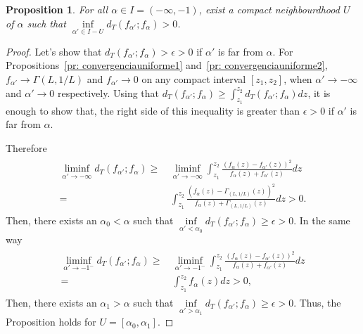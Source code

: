 \documentclass[technote,onecolumn,draftcls,12pt]{IEEEtran}
\newtheorem{proposition}{Proposition}
\numberwithin{equation}{section}
\newenvironment{dem}[1][Proof]{\begin{proof}[{\it #1}]}{\end{proof}}
\newcommand{\al}{&\,}
\newcommand{\pa}[1]{\ensuremath{\left( #1 \right)}}
\begin{document}
\begin{proposition}
	\label{pr: falpha>0}
	For all $\alpha\in I=(-\infty,-1)$, exist a compact neighbourdhood $U$ of $\alpha$ such that
	$\inf\limits_{\alpha'\in I-U}d_{T}({f_{\alpha'};f_{\alpha}})>0$.
\end{proposition}
\begin{dem}
	Let's show that $d_{T}({f_{\alpha'};f_{\alpha}})>\epsilon>0$ if $\alpha'$ is far from $\alpha$. For Propositions~\ref{pr: convergenciauniforme1} and~\ref{pr: convergenciauniforme2}, $f_{\alpha'} \to \Gamma(L,1/L)$ and $f_{\alpha'} \to 0$ on any compact interval $[z_1,z_2]$, when $\alpha' \to -\infty$ and $\alpha' \to 0$ respectively.
	Using that $d_{T}\pa{f_{\alpha'};f_{\alpha}} \ge \int_{z_{1}}^{z_{2}}d_{T}\pa{f_{\alpha'};f_{\alpha}}dz$, it is enough to show that, the right side of this inequality is greater than $\epsilon>0$ if $\alpha'$ is far from $\alpha$.
	
	Therefore
	\begin{align*}
	\begin{split}
	\liminf_{\alpha'\to-\infty} d_{T}\pa{f_{\alpha'};f_{\alpha}} 
	\ge \al \liminf_{\alpha'\to-\infty}\int_{z_{1}}^{z_{2}}\frac{\pa{f_{\alpha}\pa{z}-f_{\alpha'}\pa{z}}^{2}}
	{f_{\alpha}\pa{z}+f_{\alpha'}\pa{z}}dz \\
	= \al \int_{z_{1}}^{z_{2}}\frac{\pa{f_{\alpha}\pa{z}-\Gamma_{(L,1/L)}\pa{z}}^{2}}
	{f_{\alpha}\pa{z}+\Gamma_{(L,1/L)}\pa{z}}dz >0.
	\end{split}
	\end{align*}
	Then, there exists an $\alpha_0 < \alpha$ such that $\inf\limits_{\alpha'<\alpha_0} d_{T}\pa{f_{\alpha'};f_{\alpha}} \ge \epsilon>0.$ 
	In the same way
	\begin{align*}
	\begin{split}
	\liminf_{\alpha'\to-1^{-}} d_{T}\pa{f_{\alpha'};f_{\alpha}} 
	\ge \al \liminf_{\alpha'\to-1^{-}}\int_{z_{1}}^{z_{2}}\frac{\pa{f_{\alpha}\pa{z}-f_{\alpha'}\pa{z}}^{2}}
	{f_{\alpha}\pa{z}+f_{\alpha'}\pa{z}}dz \\
	= \al \int_{z_{1}}^{z_{2}}f_{\alpha}\pa{z}dz >0,
	\end{split}
	\end{align*}
	Then, there exists an $\alpha_1>\alpha$ such that $\inf\limits_{\alpha'>\alpha_1} d_{T}\pa{f_{\alpha'};f_{\alpha}} \ge \epsilon>0.$ 
	Thus, the Proposition holds for $U=[\alpha_0,\alpha_1].$
\end{dem}
\end{document}
